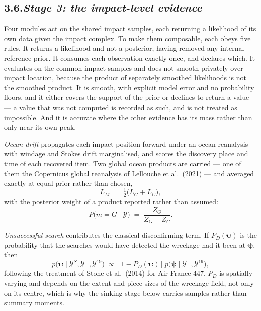 \documentclass[12pt,a4paper]{article}
\newcommand{\Ev}{\mathcal{Y}}
\newcommand{\impact}{\boldsymbol{\psi}}
\begin{document}
\subsection*{3.6.\quad \textit{Stage 3: the impact-level evidence}}

Four modules act on the shared impact samples, each returning a likelihood of its own data
given the impact complex. To make them composable, each obeys five rules. It returns a
likelihood and not a posterior, having removed any internal reference prior. It consumes each
observation exactly once, and declares which. It evaluates on the common impact samples and does
not smooth privately over impact location, because the product of separately smoothed
likelihoods is not the smoothed product. It is smooth, with explicit model error and no
probability floors, and it either covers the support of the prior or declines to return a value
--- a value that was not computed is recorded as such, and is not treated as impossible. And it
is accurate where the other evidence has its mass rather than only near its own peak.

\emph{Ocean drift} propagates each impact position forward under an ocean reanalysis with
windage and Stokes drift marginalised, and scores the discovery place and time of each recovered
item. Two global ocean products are carried --- one of them the Copernicus global reanalysis of
Lellouche et al.\ (2021) --- and averaged exactly at equal prior rather than chosen,
%
\begin{equation}
L_{M} \;=\; \tfrac{1}{2}\bigl(L_{G} + L_{C}\bigr),
\end{equation}
%
with the posterior weight of a product reported rather than assumed:
%
\begin{equation}
P\bigl(m = G \mid \Ev\bigr) \;=\; \frac{Z_{G}}{Z_{G} + Z_{C}}.
\end{equation}

\emph{Unsuccessful search} contributes the classical disconfirming term. If $P_D(\impact)$ is
the probability that the searches would have detected the wreckage had it been at $\impact$,
then
%
\begin{equation}
p\bigl(\impact \mid \Ev^{S}, \Ev^{-}, \Ev^{19}\bigr)
 \;\propto\; \bigl[\,1 - P_D(\impact)\,\bigr]\;
   p\bigl(\impact \mid \Ev^{-}, \Ev^{19}\bigr),
\end{equation}
%
following the treatment of Stone et al.\ (2014) for Air France 447. $P_D$ is spatially varying
and depends on the extent and piece sizes of the wreckage field, not only on its centre, which
is why the sinking stage below carries samples rather than summary moments.
\end{document}
